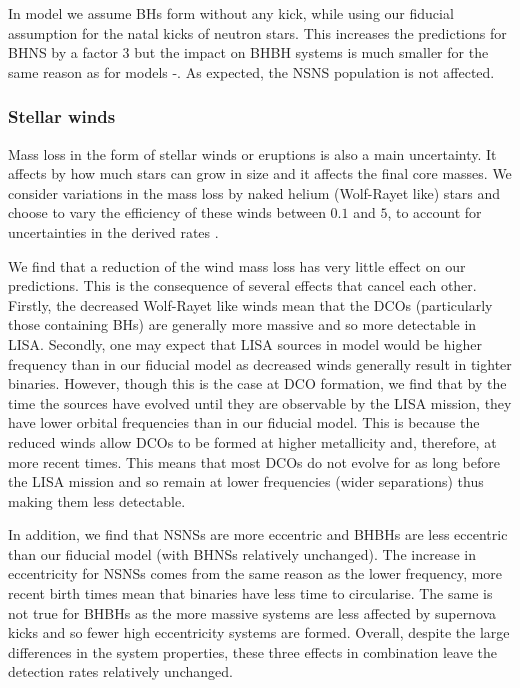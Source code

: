 In model \modNoBH{} we assume BHs form without any kick, while using our fiducial assumption for the natal kicks of neutron stars. This increases the predictions for BHNS by a factor 3 but the impact on BHBH systems is much smaller for the same reason as for models \modSigLow{}-\modSigLower{}. As expected, the NSNS population is not affected. 

\subsubsection{Stellar winds}
Mass loss in the form of stellar winds or eruptions is also a main uncertainty. It affects by how much stars can grow in size and it affects the final core masses. We consider variations in the mass loss by naked helium (Wolf-Rayet like) stars and choose to vary the efficiency of these winds between $0.1$ and $5$, to account for uncertainties in the derived rates \citep[e.g.][]{Vink+2017, Shenar+2019, Hamann+2019, Sander+2020}.

We find that a reduction of the wind mass loss has very little effect on our predictions. This is the consequence of several effects that cancel each other. Firstly, the decreased Wolf-Rayet like winds mean that the DCOs (particularly those containing BHs) are generally more massive and so more detectable in LISA. Secondly, one may expect that LISA sources in model \modWRLow{} would be higher frequency than in our fiducial model as decreased winds generally result in tighter binaries. However, though this is the case at DCO formation, we find that by the time the sources have evolved until they are observable by the LISA mission, they have lower orbital frequencies than in our fiducial model. This is because the reduced winds allow DCOs to be formed at higher metallicity and, therefore, at more recent times. This means that most DCOs do not evolve for as long before the LISA mission and so remain at lower frequencies (wider separations) thus making them less detectable.

In addition, we find that NSNSs are more eccentric and BHBHs are less eccentric than our fiducial model (with BHNSs relatively unchanged). The increase in eccentricity for NSNSs comes from the same reason as the lower frequency, more recent birth times mean that binaries have less time to circularise. The same is not true for BHBHs as the more massive systems are less affected by supernova kicks and so fewer high eccentricity systems are formed. Overall, despite the large differences in the system properties, these three effects in combination leave the detection rates relatively unchanged.

